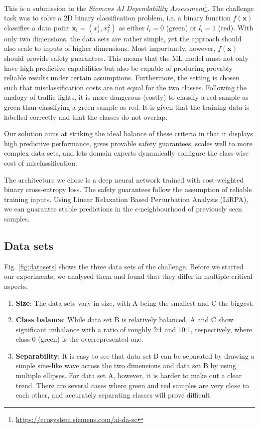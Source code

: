 \documentclass[acmsmall,nonacm]{acmart}
\begin{document}
This is a submission to the \textit{Siemens AI Dependability Assessment}\footnote{\url{https://ecosystem.siemens.com/ai-da-sc}}. The challenge task was to solve a 2D binary classification problem, i.e. a binary function $f(\mathbf{x})$ classifies a data point $\mathbf{x_i} = (x_i^1, x_i^2)$ as either $l_i=0$ (green) or $l_i=1$ (red). With only two dimensions, the data sets are rather simple, yet the approach should also scale to inputs of higher dimensions. Most importantly, however, $f(\mathbf{x})$ should provide safety guarantees. This means that the ML model must not only have high predictive capabilities but also be capable of producing provably reliable results under certain assumptions. Furthermore, the setting is chosen such that misclassification costs are not equal for the two classes. Following the analogy of traffic lights, it is more dangerous (costly) to classify a red sample as green than classifying a green sample as red. It is given that the training data is labelled correctly and that the classes do not overlap.  

Our solution aims at striking the ideal balance of these criteria in that it displays high predictive performance, gives provable safety guarantees, scales well to more complex data sets, and lets domain experts dynamically configure the class-wise cost of misclassification.

The architecture we chose is a deep neural network trained with cost-weighted binary cross-entropy loss. The safety guarantees follow the assumption of reliable training inputs. Using Linear Relaxation Based Perturbation Analysis (LiRPA), we can guarantee stable predictions in the $\epsilon$-neighbourhood of previously seen samples.

\subsection{Data sets}

Fig. \ref{fig:datasets} shows the three data sets of the challenge. Before we started our experiments, we analysed them and found that they differ in multiple critical aspects. 

\begin{enumerate}
	\item \textbf{Size}: The data sets vary in size, with A being the smallest and C the biggest.
	\item \textbf{Class balance}: While data set B is relatively balanced, A and C show significant imbalance with a ratio of roughly 2:1 and 10:1, respectively, where class 0 (green) is the overrepresented one.
	\item \textbf{Separability}: It is easy to see that data set B can be separated by drawing a simple sine-like wave across the two dimensions and data set B by using multiple ellipses. For data set A, however, it is harder to make out a clear trend. There are several cases where green and red samples are very close to each other, and accurately separating classes will prove difficult.
\end{enumerate}
\end{document}
